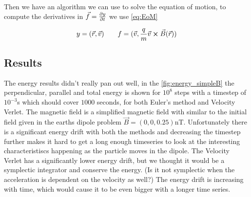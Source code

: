 \documentclass[x11names]{article}
\renewcommand{\va}{\vec}
\begin{document}
    Then we have an algorithm we can use to solve the equation of motion, to compute the derivatives in \(\va{f} = \pdv{y}{t}\) we use \cref{eq:EoM} 

    \begin{align}
      y = ( \va{r}, \va{v} )
      \qquad
      f = ( \va{v}, \frac{q}{m} \va{ v }\cross \va{B}(\va{r})  )
    \end{align}


\subsection{Results}
    
    The energy results didn't really pan out well, in the \cref{fig:energy_simpleB} the perpendicular, parallel and total energy is shown for \(10^8\) steps with a timestep of \(10^{-3}\)s which should cover \(1000\) seconds, for both Euler's method and Velocity Verlet. The magnetic field is a simplified magnetic field with similar to the initial field given in the earths dipole problem \(\va{B} = (0,0,0.25) \si{\nano\tesla}\). Unfortunately there is a significant energy drift with both the methods and decreasing the timestep further makes it hard to get a long enough timeseries to look at the interesting characteristiscs happening as the particle moves in the dipole.  The Velocity Verlet has a significantly lower energy drift, but we thought it would be a symplectic integrator and conserve the energy. (Is it not symplectic when the acceleration is dependent on the velocity as well?) The energy drift is increasing with time, which would cause it to be even bigger with a longer time series.
    \\ \\
\end{document}
